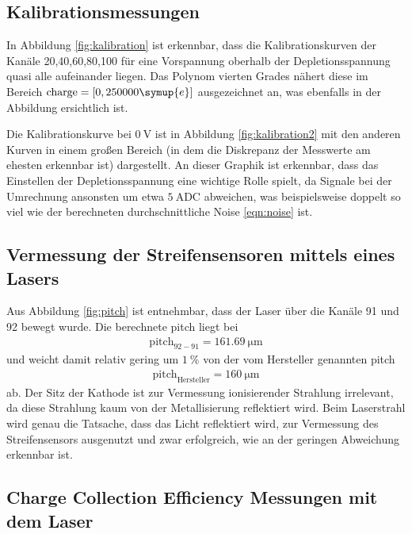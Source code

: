 \subsection{Kalibrationsmessungen}

In Abbildung \ref{fig:kalibration} ist erkennbar, dass die Kalibrationskurven der Kanäle 20,40,60,80,100
für eine Vorspannung oberhalb der Depletionsspannung quasi alle aufeinander liegen. Das Polynom vierten Grades
nähert diese im Bereich $\text{charge} = [0,250000 \symup{e}]$ ausgezeichnet an, was ebenfalls in der
Abbildung ersichtlich ist.

Die Kalibrationskurve bei $\SI{0}{\volt}$ ist in Abbildung \ref{fig:kalibration2} mit den anderen Kurven
in einem großen Bereich (in dem die Diskrepanz der Messwerte am ehesten erkennbar ist) dargestellt.
An dieser Graphik ist erkennbar, dass das Einstellen der Depletionsspannung
eine wichtige Rolle spielt, da Signale bei der Umrechnung ansonsten um etwa $\SI{5}{\text{ADC}}$ abweichen, was
beispielsweise doppelt so viel wie der berechneten durchschnittliche Noise \eqref{eqn:noise} ist.

\subsection{Vermessung der Streifensensoren mittels eines Lasers}

Aus Abbildung \ref{fig:pitch} ist entnehmbar, dass der Laser über die Kanäle 91 und 92 bewegt wurde.
Die berechnete pitch liegt bei
\begin{align}
  \text{pitch}_{92-91} = \SI{161.69}{\micro\meter}
\end{align}
und weicht damit relativ gering um $\SI{1}{\percent}$ von der vom Hersteller genannten pitch
\begin{align}
  \text{pitch}_\text{Hersteller} = \SI{160}{\micro\meter}
\end{align}
ab. Der Sitz der Kathode ist zur Vermessung ionisierender Strahlung irrelevant, da diese Strahlung
kaum von der Metallisierung reflektiert wird. Beim Laserstrahl wird genau die Tatsache, dass das
Licht reflektiert wird, zur Vermessung des Streifensensors ausgenutzt und zwar erfolgreich,
wie an der geringen Abweichung erkennbar ist.

\subsection{Charge Collection Efficiency Messungen mit dem Laser}


